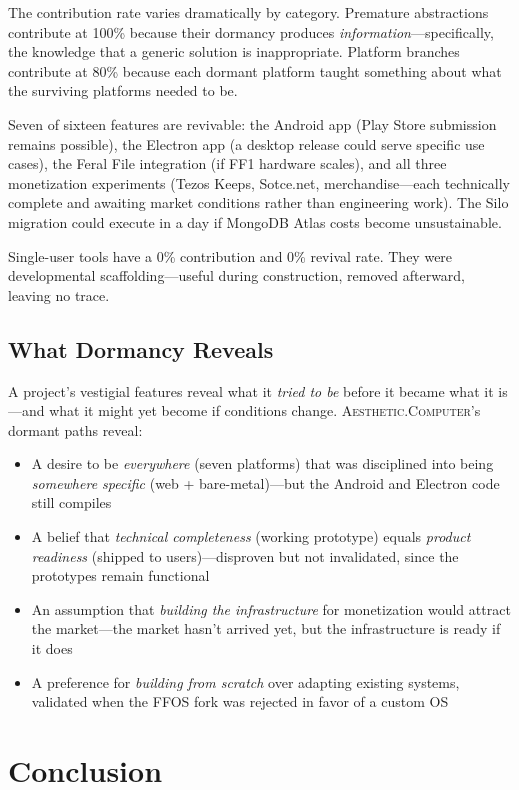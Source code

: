 \documentclass[10pt,letterpaper,twocolumn]{article}
\newcommand{\ac}{\textsc{Aesthetic.Computer}}
\begin{document}
The contribution rate varies dramatically by category. Premature abstractions contribute at 100\% because their dormancy produces \emph{information}---specifically, the knowledge that a generic solution is inappropriate. Platform branches contribute at 80\% because each dormant platform taught something about what the surviving platforms needed to be.

Seven of sixteen features are revivable: the Android app (Play Store submission remains possible), the Electron app (a desktop release could serve specific use cases), the Feral File integration (if FF1 hardware scales), and all three monetization experiments (Tezos Keeps, Sotce.net, merchandise---each technically complete and awaiting market conditions rather than engineering work). The Silo migration could execute in a day if MongoDB Atlas costs become unsustainable.

Single-user tools have a 0\% contribution and 0\% revival rate. They were developmental scaffolding---useful during construction, removed afterward, leaving no trace.

\subsection{What Dormancy Reveals}

A project's vestigial features reveal what it \emph{tried to be} before it became what it is---and what it might yet become if conditions change. \ac{}'s dormant paths reveal:

\begin{itemize}
  \item A desire to be \emph{everywhere} (seven platforms) that was disciplined into being \emph{somewhere specific} (web + bare-metal)---but the Android and Electron code still compiles
  \item A belief that \emph{technical completeness} (working prototype) equals \emph{product readiness} (shipped to users)---disproven but not invalidated, since the prototypes remain functional
  \item An assumption that \emph{building the infrastructure} for monetization would attract the market---the market hasn't arrived yet, but the infrastructure is ready if it does
  \item A preference for \emph{building from scratch} over adapting existing systems, validated when the FFOS fork was rejected in favor of a custom OS
\end{itemize}

\section{Conclusion}
\end{document}
